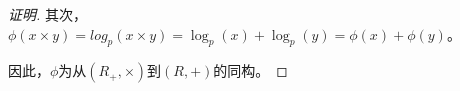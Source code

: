 \documentclass{article}
\begin{document}
\begin{CJK*}{UTF8}{gbsn}
\begin{proof}[证明]
  其次，$\phi(x\times y)=log_p(x\times y)=\log_p(x)+\log_p(y)=\phi(x)+\phi(y)$。

  因此，$\phi$为从$(R_+,\times)$到$(R,+)$的同构。
\end{proof}
\end{CJK*}
\end{document}

